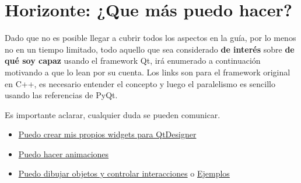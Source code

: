 \section{Horizonte: ¿Que m\'as puedo hacer?}
Dado que no es posible llegar a cubrir todos los aspectos en la gu\'ia, por lo menos no en un tiempo limitado,
todo aquello que sea considerado \textbf{de inter\'es} sobre \textbf{de qu\'e soy capaz} usando el framework Qt, ir\'a
enumerado a continuaci\'on motivando a que lo lean por su cuenta. Los links son para el framework original en C++, es necesario
entender el concepto y luego el paralelismo es sencillo usando las referencias de PyQt.

Es importante aclarar, cualquier duda se pueden comunicar.

\begin{itemize}
    \item \href{https://doc.qt.io/qt-5/qtdesigner-customwidgetplugin-example.html}{Puedo crear mis propios widgets para QtDesigner}
    \item \href{http://zetcode.com/pyqt/qpropertyanimation/}{Puedo hacer animaciones}
    \item \href{https://doc.qt.io/archives/qt-4.8/graphicsview.html}{Puedo dibujar objetos y controlar interacciones} o \href{https://www.programcreek.com/python/example/52414/PyQt4.QtGui.QGraphicsView}{Ejemplos}
\end{itemize}